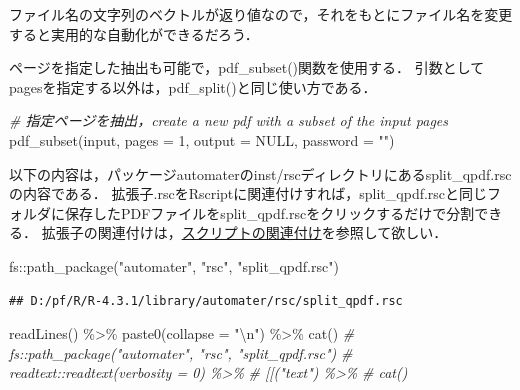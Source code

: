 \documentclass[
]{article}
\newenvironment{Shaded}{\begin{snugshade}}{\end{snugshade}}
\newcommand{\AttributeTok}[1]{\textcolor[rgb]{0.77,0.63,0.00}{#1}}
\newcommand{\CommentTok}[1]{\textcolor[rgb]{0.56,0.35,0.01}{\textit{#1}}}
\newcommand{\ConstantTok}[1]{\textcolor[rgb]{0.00,0.00,0.00}{#1}}
\newcommand{\DecValTok}[1]{\textcolor[rgb]{0.00,0.00,0.81}{#1}}
\newcommand{\FunctionTok}[1]{\textcolor[rgb]{0.00,0.00,0.00}{#1}}
\newcommand{\NormalTok}[1]{#1}
\newcommand{\SpecialCharTok}[1]{\textcolor[rgb]{0.00,0.00,0.00}{#1}}
\newcommand{\StringTok}[1]{\textcolor[rgb]{0.31,0.60,0.02}{#1}}
\begin{document}
ファイル名の文字列のベクトルが返り値なので，それをもとにファイル名を変更すると実用的な自動化ができるだろう．

ページを指定した抽出も可能で，pdf\_subset()関数を使用する．
引数としてpagesを指定する以外は，pdf\_split()と同じ使い方である．

\begin{Shaded}
\begin{Highlighting}[]
  \CommentTok{\# 指定ページを抽出，create a new pdf with a subset of the input pages}
\FunctionTok{pdf\_subset}\NormalTok{(input, }\AttributeTok{pages =} \DecValTok{1}\NormalTok{, }\AttributeTok{output =} \ConstantTok{NULL}\NormalTok{, }\AttributeTok{password =} \StringTok{""}\NormalTok{)}
\end{Highlighting}
\end{Shaded}

以下の内容は，パッケージautomaterのinst/rscディレクトリにあるsplit\_qpdf.rscの内容である．
拡張子.rscをRscriptに関連付けすれば，split\_qpdf.rscと同じフォルダに保存したPDFファイルをsplit\_qpdf.rscをクリックするだけで分割できる．
拡張子の関連付けは，\protect\hyperlink{assoc}{スクリプトの関連付け}を参照して欲しい．

\begin{Shaded}
\begin{Highlighting}[]
\NormalTok{fs}\SpecialCharTok{::}\FunctionTok{path\_package}\NormalTok{(}\StringTok{"automater"}\NormalTok{, }\StringTok{"rsc"}\NormalTok{, }\StringTok{"split\_qpdf.rsc"}\NormalTok{)}
\end{Highlighting}
\end{Shaded}

\begin{verbatim}
## D:/pf/R/R-4.3.1/library/automater/rsc/split_qpdf.rsc
\end{verbatim}

\begin{Shaded}
\begin{Highlighting}[]
  \FunctionTok{readLines}\NormalTok{() }\SpecialCharTok{\%\textgreater{}\%}
  \FunctionTok{paste0}\NormalTok{(}\AttributeTok{collapse =} \StringTok{"}\SpecialCharTok{\textbackslash{}n}\StringTok{"}\NormalTok{) }\SpecialCharTok{\%\textgreater{}\%}
  \FunctionTok{cat}\NormalTok{()}
  \CommentTok{\# fs::path\_package("automater", "rsc", "split\_qpdf.rsc")}
  \CommentTok{\#   readtext::readtext(verbosity = 0) \%\textgreater{}\%}
  \CommentTok{\#   \textasciigrave{}[[\textasciigrave{}("text") \%\textgreater{}\%}
  \CommentTok{\#   cat()}
\end{Highlighting}
\end{Shaded}
\end{document}

